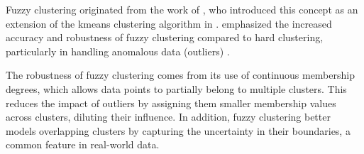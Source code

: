 \begin{toReview}
	\noindent Fuzzy clustering originated from the work of \citeauthor{FuzzyClustering_developDoc}, who introduced this concept as an extension of the \gls{kmeans} clustering algorithm in \citeyear{FuzzyClustering_developDoc}. \citeauthor{FuzzyClustering_developDoc} emphasized the increased accuracy and robustness of fuzzy clustering compared to hard clustering, particularly in handling anomalous data (outliers) \citep{FuzzyClustering_developDoc}.

	\noindent The robustness of fuzzy clustering comes from its use of continuous membership degrees, which allows data points to partially belong to multiple clusters. This reduces the impact of outliers by assigning them smaller membership values across clusters, diluting their influence. In addition, fuzzy clustering better models overlapping clusters by capturing the uncertainty in their boundaries, a common feature in real-world data.
\end{toReview}

